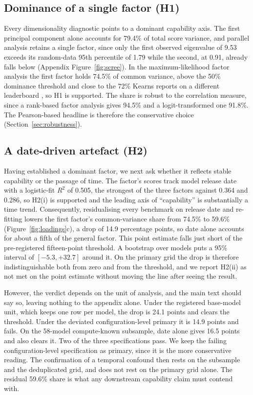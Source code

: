 \subsection{Dominance of a single factor (H1)}\label{sec:h1}
Every dimensionality diagnostic points to a dominant capability axis. The first principal component
alone accounts for 79.4\% of total score variance, and parallel analysis retains a single factor, since
only the first observed eigenvalue of 9.53 exceeds its random-data 95th percentile of 1.79 while the
second, at 0.91, already falls below (Appendix Figure~\ref{fig:scree}). In the maximum-likelihood factor
analysis the first factor holds 74.5\% of common variance, above the 50\% dominance threshold and close
to the 72\% Kearns reports on a different leaderboard \cite{kearns2026}, so H1 is supported. The share is robust
to the correlation measure, since a rank-based factor analysis gives 94.5\% and a logit-transformed one
91.8\%. The Pearson-based headline is therefore the conservative choice (Section~\ref{sec:robustness}).

\subsection{A date-driven artefact (H2)}\label{sec:h2}
Having established a dominant factor, we next ask whether it reflects stable capability or the passage of
time. The factor's scores track model release date with a logistic-fit $R^2$ of 0.505, the strongest of
the three factors against 0.364 and 0.286, so H2(i) is supported and the leading axis of ``capability''
is substantially a time trend. Consequently, residualising
every benchmark on release date and re-fitting lowers the first factor's common-variance share from
74.5\% to 59.6\% (Figure~\ref{fig:loadings}c), a drop of 14.9 percentage points, so date alone accounts
for about a fifth of the general factor. This point estimate falls just short of the pre-registered fifteen-point threshold. A bootstrap over
models puts a 95\% interval of $[-5.3, +32.7]$ around it. On the primary grid the drop is therefore
indistinguishable both from zero and from the threshold, and we report H2(ii) as not met on the point
estimate without moving the line after seeing the result.

However, the verdict depends on the unit of analysis, and the main text should say so, leaving nothing to the
appendix alone. Under the registered base-model unit, which keeps one row per model, the drop is 24.1 points
and clears the threshold. Under the deviated configuration-level primary it is 14.9 points and fails. On
the 58-model compute-known subsample, date alone gives 16.5 points and also clears it. Two of the
three specifications pass. We keep the failing configuration-level specification as primary, since it is
the more conservative reading. The confirmation of a temporal confound then rests on the subsample and the
deduplicated grid, and does not rest on the primary grid alone. The residual 59.6\% share is what any downstream
capability claim must contend with.

